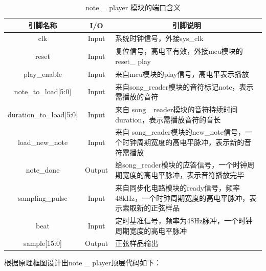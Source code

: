 \documentclass{../source/Experiment}
\begin{document}
                \begin{table}[H]
                    \caption{note \_ player 模块的端口含义}
                    \begin{tabular}{|c|c|p{}|}
                        \hline
                        引脚名称                        & I/O    & \multicolumn{1}{c|}{引脚说明}                              \\ \hline
                        clk                         & Input  & 系统时钟信号，外接sys\_clk                                      \\ \hline
                        reset                       & Input  & 复位信号，高电平有效，外接mcu模块的reset\_ play                        \\ \hline
                        play\_enable                & Input  & 来自mcu模块的play信号，高电平表示播放                                 \\ \hline
                        note\_to\_load{[}5:0{]}     & Input  & 来自song\_reader模块的音符标记note，表示需播放的音符                     \\ \hline
                        duration\_to\_load{[}5:0{]} & Input  & 来自 song \_reader模块的音符持续时间duration，表示需播放音符的音长           \\ \hline
                        load\_new\_note             & Input  & 来自 song\_reader模块的new\_note信号，一个时钟周期宽度的高电平脉冲，表示新的音符需播放 \\ \hline
                        note\_done                  & Output & 给song\_reader模块的应答信号，一个时钟周期宽度的高电平脉冲，表示音符播放完毕           \\ \hline
                        sampling\_pulse             & Input  & 来自同步化电路模块的ready信号，频率48kHz，一个时钟周期宽度的高电平脉冲，表示索取新的正弦样品    \\ \hline
                        beat                        & Input  & 定时基准信号，频率为48Hz脉冲，一个时钟周期宽度的高电平脉冲                        \\ \hline
                        sample{[}15:0{]}            & Output & 正弦样品输出                                                 \\ \hline
                    \end{tabular}
                \end{table}

                根据原理框图设计出note \_ player顶层代码如下：
                
               
\end{document}
